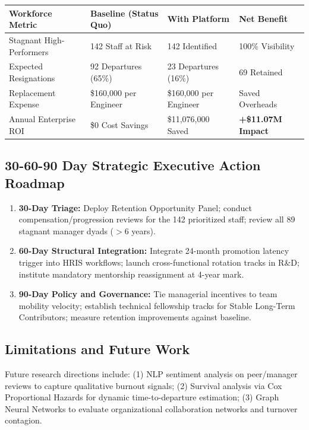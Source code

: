 \documentclass[12pt,a4paper,oneside]{article}
\begin{document}
\begin{center}
\fontsize{9}{11}\selectfont
\begin{tabular}{|L{3.4cm}|C{4.2cm}|C{3.0cm}|C{3.4cm}|}
\hline
\textbf{Workforce Metric} & \textbf{Baseline (Status Quo)} & \textbf{With Platform} & \textbf{Net Benefit} \\ \hline
Stagnant High-Performers & 142 Staff at Risk & 142 Identified & 100\% Visibility \\ \hline
Expected Resignations & 92 Departures (65\%) & 23 Departures (16\%) & 69 Retained \\ \hline
Replacement Expense & \$160,000 per Engineer & \$160,000 per Engineer & Saved Overheads \\ \hline
Annual Enterprise ROI & \$0 Cost Savings & \$11,076,000 Saved & \textbf{+\$11.07M Impact} \\ \hline
\end{tabular}
\vspace{0.02in}
\label{tab:financial_roi}
\end{center}

\subsection{30-60-90 Day Strategic Executive Action Roadmap}
\begin{enumerate}
  \item \textbf{30-Day Triage:} Deploy Retention Opportunity Panel; conduct compensation/progression reviews for the 142 prioritized staff; review all 89 stagnant manager dyads ($>6$ years).
  \item \textbf{60-Day Structural Integration:} Integrate 24-month promotion latency trigger into HRIS workflows; launch cross-functional rotation tracks in R\&D; institute mandatory mentorship reassignment at 4-year mark.
  \item \textbf{90-Day Policy and Governance:} Tie managerial incentives to team mobility velocity; establish technical fellowship tracks for Stable Long-Term Contributors; measure retention improvements against baseline.
\end{enumerate}

\subsection{Limitations and Future Work}
Future research directions include: (1) NLP sentiment analysis on peer/manager reviews to capture qualitative burnout signals; (2) Survival analysis via Cox Proportional Hazards for dynamic time-to-departure estimation; (3) Graph Neural Networks to evaluate organizational collaboration networks and turnover contagion.
\end{document}
